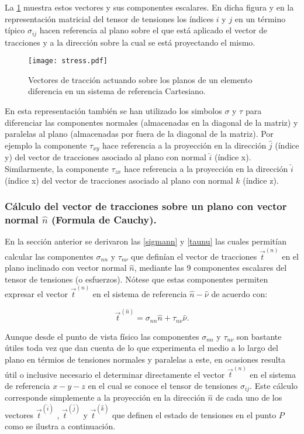 \documentclass[../notas medios.tex]{subfiles}
\begin{document}
La \cref{stress} muestra estos vectores y sus componentes escalares. En dicha
figura y en la representación matricial del tensor de tensiones los índices $i$
y $j$ en un término típico $\sigma_{ij}$ hacen referencia al plano sobre el que
está aplicado el vector de tracciones y a la dirección sobre la cual se está proyectando el mismo.

\begin{figure}[H]
\centering
	\texttt{[image: stress.pdf]}
	\caption{Vectores de tracción actuando sobre los planos de un elemento diferencia en un sistema de referencia Cartesiano.}
	\label{stress}
\end{figure}

En esta representación también se han utilizado los simbolos $\sigma$ y $\tau$
para diferenciar las componentes normales (almacenadas en la diagonal de la matriz) y paralelas al plano (almacenadas por fuera de la diagonal de la matriz). Por
ejemplo la componente $\tau_{xy}$ hace referencia a la proyección en la
dirección $\hat{j}$ (índice y) del vector de tracciones asociado al plano con
normal $\hat{i}$ (índice x). Similarmente, la componente $\tau_{zx}$ hace
referencia a la proyección en la dirección $\hat{i}$ (índice x) del vector de
tracciones asociado al plano con normal $\hat{k}$ (índice z).

\subsubsection{Cálculo del vector de tracciones sobre un plano con vector normal
$\hat{n}$ (Formula de Cauchy).}
En la sección anterior se derivaron las \cref{sigmann} y
\cref{taunu} las cuales permitían calcular las componentes
$\sigma_{nn}$ y $\tau_{n\nu}$ que definían el vector de tracciones ${{\vec t}^{(n)}}$ en el plano inclinado con vector normal $\hat{n}$, mediante las 9 componentes escalares del tensor de tensiones (o esfuerzos). Nótese que estas componentes permiten expresar el vector ${{\vec t}^{(n)}}$ en el sistema de referencia $\hat{n}-\hat{\nu}$ de acuerdo con:


\[ {{\vec t}^{(\hat n)}} = {\sigma _{nn}}\hat n + {\tau _{n\nu }}\hat \nu. \]

Aunque desde el punto de vista físico las componentes  $\sigma_{nn}$ y $\tau_{n\nu}$ son bastante útiles toda vez que dan cuenta de lo que experimenta el medio a lo largo del plano en térmios de tensiones normales y paralelas a este, en ocasiones resulta útil o inclusive necesario el determinar directamente el vector ${{\vec t}^{(n)}}$ en el sistema de referencia $x-y-z$ en el cual se conoce el tensor de tensiones $\sigma_{ij}$. Este cálculo corresponde simplemente a la proyección en la dirección $\hat{n}$ de cada uno de los vectores  ${{\vec t}^{(\hat i)}}$ , ${{\vec t}^{(\hat j)}}$ y ${{\vec t}^{(\hat k)}}$ que definen el estado de tensiones en el punto $P$ como se ilustra a continuación.
\end{document}
